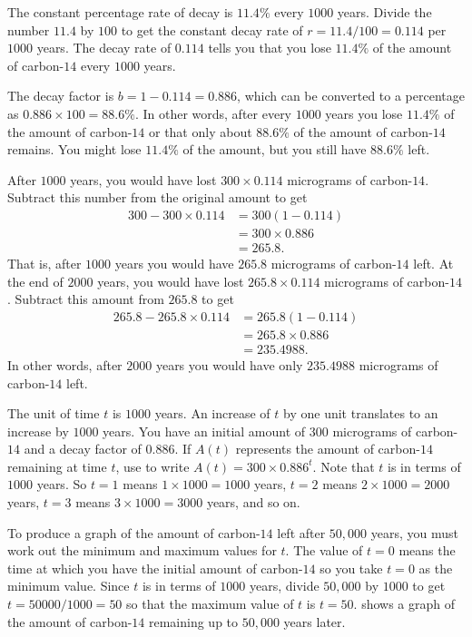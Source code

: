 \documentclass[a4paper,oneside,12pt]{article}
\begin{document}
\begin{solution}
The constant percentage rate of decay is $11.4\%$ every $1000$ years.
Divide the number $11.4$ by $100$ to get the constant decay rate of
$r = 11.4 / 100 = 0.114$ per $1000$ years.  The decay rate of $0.114$
tells you that you lose $11.4\%$ of the amount of carbon-$14$ every
$1000$ years.

The decay factor is $b = 1 - 0.114 = 0.886$, which can be converted to
a percentage as $0.886 \times 100 = 88.6\%$.  In other words, after
every $1000$ years you lose $11.4\%$ of the amount of carbon-$14$ or
that only about $88.6\%$ of the amount of carbon-$14$ remains.  You
might lose $11.4\%$ of the amount, but you still have $88.6\%$ left.

After $1000$ years, you would have lost $300 \times 0.114$ micrograms
of carbon-$14$.  Subtract this number from the original amount to get
\begin{align*}
300 - 300 \times 0.114
&=
300 (1 - 0.114) \\[4pt]
&=
300 \times 0.886 \\[4pt]
&=
265.8.
\end{align*}
That is, after $1000$ years you would have $265.8$ micrograms of
carbon-$14$ left.  At the end of $2000$ years, you would have lost
$265.8 \times 0.114$ micrograms of carbon-$14$.  Subtract this amount
from $265.8$ to get
\begin{align*}
265.8 - 265.8 \times 0.114
&=
265.8 (1 - 0.114) \\[4pt]
&=
265.8 \times 0.886 \\[4pt]
&=
235.4988.
\end{align*}
In other words, after $2000$ years you would have only $235.4988$
micrograms of carbon-$14$ left.

The unit of time $t$ is $1000$ years.  An increase of $t$ by one unit
translates to an increase by $1000$ years.  You have an initial amount
of $300$ micrograms of carbon-$14$ and a decay factor of $0.886$.  If
$A(t)$ represents the amount of carbon-$14$ remaining at time $t$, use
 to write $A(t) = 300 \times 0.886^t$.
Note that $t$ is in terms of $1000$ years.  So $t = 1$ means
$1 \times 1000 = 1000$ years, $t = 2$ means $2 \times 1000 = 2000$
years, $t = 3$ means $3 \times 1000 = 3000$ years, and so on.

To produce a graph of the amount of carbon-$14$ left after $50,000$
years, you must work out the minimum and maximum values for $t$.  The
value of $t = 0$ means the time at which you have the initial amount
of carbon-$14$ so you take $t = 0$ as the minimum value.  Since $t$ is
in terms of $1000$ years, divide $50,000$ by $1000$ to get
$t = 50000 / 1000 = 50$ so that the maximum value of $t$ is
$t = 50$.   shows a graph of the amount of
carbon-$14$ remaining up to $50,000$ years later.
\end{solution}
\end{document}
